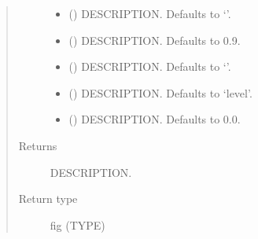 \documentclass[letterpaper,10pt,english]{sphinxmanual}
\begin{document}
\begin{fulllineitems}
\begin{fulllineitems}
\begin{quote}
\begin{description}
\begin{itemize}
\item {} 
\sphinxAtStartPar
{} (\sphinxstyleliteralemphasis{\sphinxupquote{, }}) \textendash{} DESCRIPTION. Defaults to ‘’.

\item {} 
\sphinxAtStartPar
{} (\sphinxstyleliteralemphasis{\sphinxupquote{, }}) \textendash{} DESCRIPTION. Defaults to 0.9.

\item {} 
\sphinxAtStartPar
{} (\sphinxstyleliteralemphasis{\sphinxupquote{, }}) \textendash{} DESCRIPTION. Defaults to ‘’.

\item {} 
\sphinxAtStartPar
{} (\sphinxstyleliteralemphasis{\sphinxupquote{, }}) \textendash{} DESCRIPTION. Defaults to ‘level’.

\item {} 
\sphinxAtStartPar
{} (\sphinxstyleliteralemphasis{\sphinxupquote{, }}) \textendash{} DESCRIPTION. Defaults to 0.0.

\end{itemize}

\item[{Returns}] \leavevmode
\sphinxAtStartPar
DESCRIPTION.

\item[{Return type}] \leavevmode
\sphinxAtStartPar
fig (TYPE)

\end{description}\end{quote}

\end{fulllineitems}


\begin{fulllineitems}
\label{\detokenize{core/modelclass:modelclass.Dekomp_Mixin.totdif}}
\pysigstartsignatures
{}
\pysigstopsignatures
\end{fulllineitems}


\end{fulllineitems}
\end{document}
